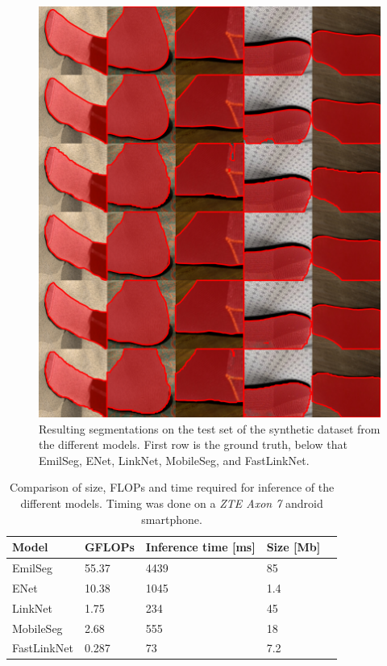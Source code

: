 \documentclass{kththesis}
\begin{document}
 \begin{figure}[h]
  \centering
  \includegraphics[width=\textwidth]{test_color}
  \caption{Resulting segmentations on the test set of the synthetic dataset from the different models. First row is the ground
    truth, below that EmilSeg, ENet, LinkNet, MobileSeg, and FastLinkNet.}
  \label{fig:seg_test}
  \end{figure}
  
\begin{table}[]
\centering
\caption{Comparison of size, FLOPs and time required for inference of the
  different models. Timing was done on a \textit{ZTE Axon 7} android smartphone.}
\label{tab:res_resources}
\begin{tabular}{@{}lllll@{}}
\toprule
Model       &  GFLOPs  & Inference time {[}ms{]} & Size {[}Mb{]}  \\ \midrule
EmilSeg     &  55.37   & 4439                    & 85             \\
ENet        &  10.38   & 1045                    & 1.4            \\
LinkNet     &  1.75    & 234                     & 45             \\
MobileSeg   &  2.68    & 555                     & 18             \\
FastLinkNet &  0.287   & 73                      & 7.2            \\ \bottomrule
\end{tabular}
\end{table}
\end{document}
